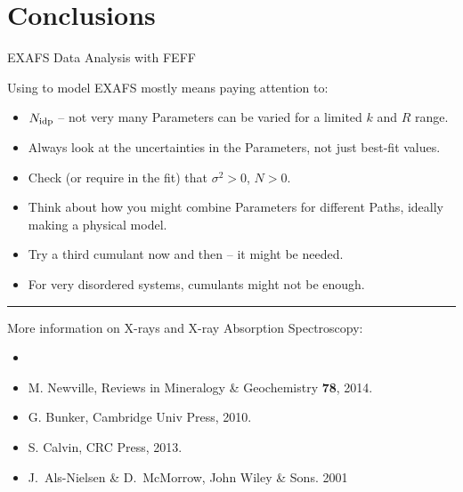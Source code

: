 \documentclass[9pt,aspectratio=1610]{beamer}
\begin{document}
\section{Conclusions}
\begin{slide}{EXAFS Data Analysis with FEFF}


  \begin{cenpage}{126mm}

    Using {\feff} to model EXAFS mostly means paying attention to:

    \begin{itemize}
    \item   $N_{\rm idp}$ -- not very many
      Parameters can be varied for a limited $k$ and $R$ range.
    \item   Always look at the uncertainties in the Parameters, not just
      best-fit values.
    \item   Check (or require in the fit) that $\sigma^2 > 0$,  $N > 0$.
    \item   Think about how you might combine Parameters for different
      Paths, ideally making a physical model.
    \item  Try a third cumulant now and then -- it might be needed.
    \item   For very disordered systems, cumulants might not be enough.
    \end{itemize}

        \vmm     \hrule \vmm

  More information on X-rays and X-ray Absorption Spectroscopy:

  \begin{itemize}
  \item[] {}
  \item[] {} M. Newville, Reviews in  Mineralogy \& Geochemistry {\bf{78}}, 2014.
  \item[] {} G. Bunker, Cambridge Univ  Press,  2010.
  \item[] {} S. Calvin, CRC Press, 2013.
  \item[]  {}  J.~Als-Nielsen
    \& D.~McMorrow,  John Wiley \& Sons. 2001

  \end{itemize}

\end{cenpage}


 \vfill
\end{slide}
\end{document}
